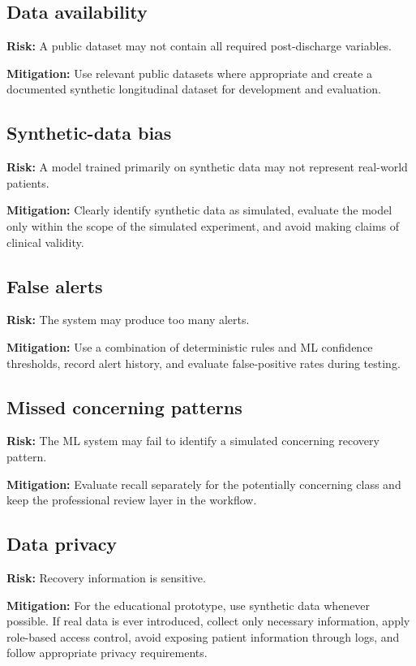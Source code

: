 \documentclass[11pt,a4paper]{article}
\begin{document}
\subsection{Data availability}

\textbf{Risk:} A public dataset may not contain all required
post-discharge variables.

\textbf{Mitigation:}
Use relevant public datasets where appropriate and create a
documented synthetic longitudinal dataset for development and evaluation.

\subsection{Synthetic-data bias}

\textbf{Risk:} A model trained primarily on synthetic data may not
represent real-world patients.

\textbf{Mitigation:}
Clearly identify synthetic data as simulated, evaluate the
model only within the scope of the simulated experiment, and avoid making
claims of clinical validity.

\subsection{False alerts}

\textbf{Risk:} The system may produce too many alerts.

\textbf{Mitigation:}
Use a combination of deterministic rules and ML confidence
thresholds, record alert history, and evaluate false-positive rates during
testing.

\subsection{Missed concerning patterns}

\textbf{Risk:} The ML system may fail to identify a simulated
concerning recovery pattern.

\textbf{Mitigation:}
Evaluate recall separately for the potentially concerning
class and keep the professional review layer in the workflow.

\subsection{Data privacy}

\textbf{Risk:} Recovery information is sensitive.

\textbf{Mitigation:}
For the educational prototype, use synthetic data whenever
possible. If real data is ever introduced, collect only necessary information,
apply role-based access control, avoid exposing patient information through
logs, and follow appropriate privacy requirements.
\end{document}
